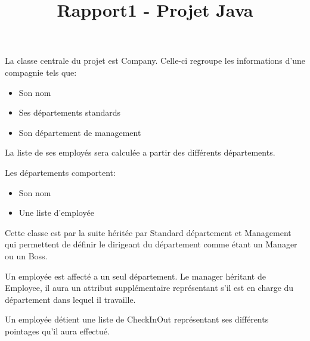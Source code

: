 
\title{Rapport1 - Projet Java}
\fancyhf{}
\lhead{\leftmark}


		La classe centrale du projet est Company. Celle-ci regroupe les informations d'une compagnie tels que:
		\begin{itemize}
			\item Son nom
			\item Ses départements standards
			\item Son département de management
		\end{itemize}
		La liste de ses employés sera calculée a partir des différents départements.
		
		Les départements comportent:
		\begin{itemize}
			\item Son nom
			\item Une liste d'employée
		\end{itemize}
		
		Cette classe est par la suite héritée par Standard département et Management qui permettent de définir le dirigeant du département comme étant un Manager ou un Boss.
		
		Un employée est affecté a un seul département. Le manager héritant de Employee, il aura un attribut supplémentaire représentant s'il est en charge du département dans lequel il travaille.
		
		Un employée détient une liste de CheckInOut représentant ses différents pointages qu'il aura effectué.
		\newpage

